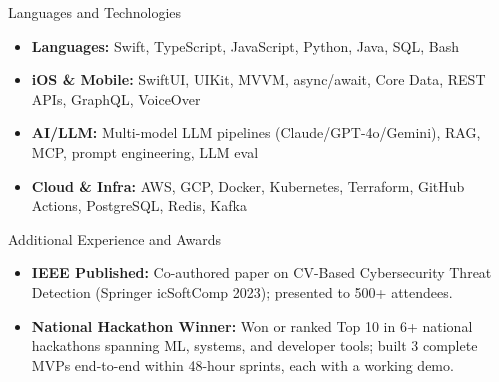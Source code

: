 \documentclass[]{mcdowellcv}
\begin{document}
\begin{cvsection}{Languages and Technologies}
  \begin{cvsubsection}{}{}{}
    \begin{itemize}
      \item \textbf{Languages:} Swift, TypeScript, JavaScript, Python, Java, SQL, Bash
      \item \textbf{iOS \& Mobile:} SwiftUI, UIKit, MVVM, async/await, Core Data, REST APIs, GraphQL, VoiceOver
      \item \textbf{AI/LLM:} Multi-model LLM pipelines (Claude/GPT-4o/Gemini), RAG, MCP, prompt engineering, LLM eval
      \item \textbf{Cloud \& Infra:} AWS, GCP, Docker, Kubernetes, Terraform, GitHub Actions, PostgreSQL, Redis, Kafka
    \end{itemize}
  \end{cvsubsection}
\end{cvsection}

\begin{cvsection}{Additional Experience and Awards}
  \begin{cvsubsection}{}{}{}
    \begin{itemize}
      \item \textbf{IEEE Published:} Co-authored paper on CV-Based Cybersecurity Threat Detection (Springer icSoftComp 2023); presented to 500+ attendees.
      \item \textbf{National Hackathon Winner:} Won or ranked Top 10 in 6+ national hackathons spanning ML, systems, and developer tools; built 3 complete MVPs end-to-end within 48-hour sprints, each with a working demo.
    \end{itemize}
  \end{cvsubsection}
\end{cvsection}
\end{document}
